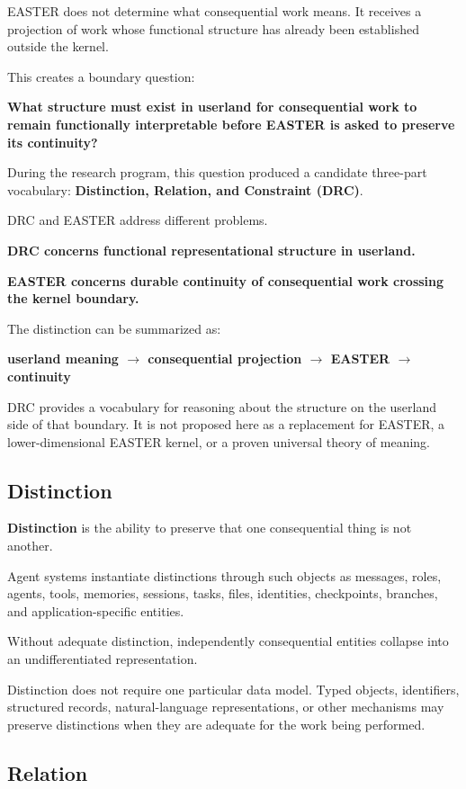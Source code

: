 \documentclass[11pt]{article}
\begin{document}
EASTER does not determine what consequential work means. It receives a projection of work whose functional structure has already been established outside the kernel.

This creates a boundary question:

\textbf{What structure must exist in userland for consequential work to remain functionally interpretable before EASTER is asked to preserve its continuity?}

During the research program, this question produced a candidate three-part vocabulary: \textbf{Distinction, Relation, and Constraint (DRC)}.

DRC and EASTER address different problems.

\textbf{DRC concerns functional representational structure in userland.}

\textbf{EASTER concerns durable continuity of consequential work crossing the kernel boundary.}

The distinction can be summarized as:

\textbf{userland meaning $\rightarrow$ consequential projection $\rightarrow$ EASTER $\rightarrow$ continuity}

DRC provides a vocabulary for reasoning about the structure on the userland side of that boundary. It is not proposed here as a replacement for EASTER, a lower-dimensional EASTER kernel, or a proven universal theory of meaning.

\subsection{Distinction}

\textbf{Distinction} is the ability to preserve that one consequential thing is not another.

Agent systems instantiate distinctions through such objects as messages, roles, agents, tools, memories, sessions, tasks, files, identities, checkpoints, branches, and application-specific entities.

Without adequate distinction, independently consequential entities collapse into an undifferentiated representation.

Distinction does not require one particular data model. Typed objects, identifiers, structured records, natural-language representations, or other mechanisms may preserve distinctions when they are adequate for the work being performed.

\subsection{Relation}
\end{document}
